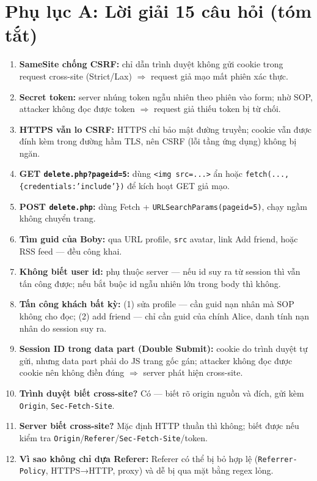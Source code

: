 \documentclass[11pt,a4paper]{article}
\begin{document}
\appendix
\section{Phụ lục A: Lời giải 15 câu hỏi (tóm tắt)}
\small
\begin{enumerate}[leftmargin=2.2em]
\item \textbf{SameSite chống CSRF:} chỉ dẫn trình duyệt không gửi cookie trong request cross-site (Strict/Lax) $\Rightarrow$ request giả mạo mất phiên xác thực.
\item \textbf{Secret token:} server nhúng token ngẫu nhiên theo phiên vào form; nhờ SOP, attacker không đọc được token $\Rightarrow$ request giả thiếu token bị từ chối.
\item \textbf{HTTPS vẫn lo CSRF:} HTTPS chỉ bảo mật đường truyền; cookie vẫn được đính kèm trong đường hầm TLS, nên CSRF (lỗi tầng ứng dụng) không bị ngăn.
\item \textbf{GET \texttt{delete.php?pageid=5}:} dùng \texttt{<img src=...>} ẩn hoặc \texttt{fetch(...,\{credentials:'include'\})} để kích hoạt GET giả mạo.
\item \textbf{POST \texttt{delete.php}:} dùng Fetch + \texttt{URLSearchParams(pageid=5)}, chạy ngầm không chuyển trang.
\item \textbf{Tìm guid của Boby:} qua URL profile, \texttt{src} avatar, link Add friend, hoặc RSS feed — đều công khai.
\item \textbf{Không biết user id:} phụ thuộc server — nếu id suy ra từ session thì vẫn tấn công được; nếu bắt buộc id ngẫu nhiên lớn trong body thì không.
\item \textbf{Tấn công khách bất kỳ:} (1) \no{} sửa profile — cần guid nạn nhân mà SOP không cho đọc; (2) \yes{} add friend — chỉ cần guid của chính Alice, danh tính nạn nhân do session suy ra.
\item \textbf{Session ID trong data part (Double Submit):} cookie do trình duyệt tự gửi, nhưng data part phải do JS trang gốc gán; attacker không đọc được cookie nên không điền đúng $\Rightarrow$ server phát hiện cross-site.
\item \textbf{Trình duyệt biết cross-site?} Có — biết rõ origin nguồn và đích, gửi kèm \texttt{Origin}, \texttt{Sec-Fetch-Site}.
\item \textbf{Server biết cross-site?} Mặc định HTTP thuần thì không; biết được nếu kiểm tra \texttt{Origin}/\texttt{Referer}/\texttt{Sec-Fetch-Site}/token.
\item \textbf{Vì sao không chỉ dựa Referer:} Referer có thể bị bỏ hợp lệ (\texttt{Referrer-Policy}, HTTPS→HTTP, proxy) và dễ bị qua mặt bằng regex lỏng.

\end{enumerate}
\end{document}
